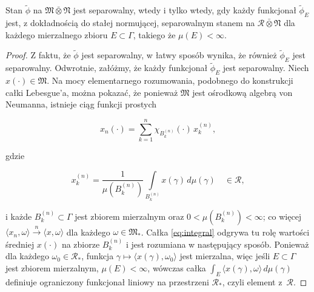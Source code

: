 \begin{Lemma}
Stan $\tilde{\phi}$ na $\mathfrak{M} \bar{\otimes} \mathfrak{N}$
jest separowalny, wtedy i tylko wtedy, gdy każdy funkcjonał $\tilde{\phi}_{E}$
jest, z dokładnością do stałej normującej, separowalnym stanem na
$\mathcal{R} \bar{\otimes} \mathfrak{N}$
dla każdego mierzalnego zbioru $E \subset \Gamma$,
takiego że $\mu(E) < \infty$.
\end{Lemma}
\begin{proof}
Z faktu, że $\tilde{\phi}$ jest separowalny, w łatwy sposób wynika, że również
$\tilde{\phi}_{E}$ jest separowalny.
Odwrotnie, załóżmy, że każdy funkcjonał $\tilde{\phi}_{E}$ jest separowalny.
Niech $x(\cdot) \in \mathfrak{M}$.
Na mocy elementarnego rozumowania,
podobnego do konstrukcji całki Lebesgue'a,
można pokazać, że ponieważ $\mathfrak{M}$ jest ośrodkową algebrą von Neumanna,
istnieje ciąg funkcji prostych
\begin{linenomath*}
 \begin{equation}
x_{n}(\cdot) =     \sum \limits_{k=1}^{n} \chi_{B_{k}^{(n)}}(\cdot)\, x_{k}^{(n)},
 \end{equation}
\end{linenomath*}
gdzie
\begin{linenomath*}
 \begin{equation}
\label{eq:integral}
x_{k}^{(n)} = \frac{1}{\mu(B_{k}^{(n)})}
\int \limits_{B_{k}^{(n)}} x(\gamma) \, d\mu(\gamma)\quad \in \mathcal{R},
 \end{equation}
\end{linenomath*}
i każde $B_{k}^{(n)} \subset \Gamma$ jest zbiorem mierzalnym oraz
$0< \mu(B_{k}^{(n)}) < \infty$;
co więcej $\langle x_{n}, \omega \rangle\stackrel{n}{\rightarrow}\langle x,
\omega \rangle$ dla każdego $\omega \in \mathfrak{M}_{*}$.
Całka \eqref{eq:integral} odgrywa tu rolę wartości średniej $x(\cdot)$
na zbiorze $B_{k}^{(n)}$ i jest rozumiana w następujący sposób.
Ponieważ dla każdego $\omega_{0} \in \mathcal{R}_{*}$,
funkcja $\gamma \mapsto \langle x(\gamma), \omega_{0} \rangle$
jest mierzalna, więc jeśli $E \subset \Gamma$ jest zbiorem mierzalnym,
$\mu(E) < \infty$,
wówczas całka $\int_{E} \langle x(\gamma), \omega \rangle \, d \mu(\gamma)$
definiuje ograniczony funkcjonał liniowy na przestrzeni $\mathcal{R}_{*}$,
czyli element \mbox{z $\mathcal{R}$}.


\end{proof}
